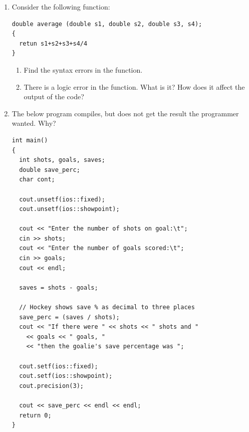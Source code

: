 \begin{enumerate}
	\item Consider the following function:
	
\noindent\begin{minipage}{\linewidth}\begin{lstlisting}
double average (double s1, double s2, double s3, s4);
{
  retun s1+s2+s3+s4/4
}
\end{lstlisting}\end{minipage}

		\begin{enumerate}
		\item Find the syntax errors in the function.
		\item There is a logic error in the function. What is it? How does it affect the output of the code?
		\end{enumerate}

  \item The below program compiles, but does not get the result the programmer wanted. Why? \nopagebreak[4]

\noindent\begin{minipage}{\linewidth}\begin{lstlisting}
int main()
{
  int shots, goals, saves;
  double save_perc;
  char cont;

  cout.unsetf(ios::fixed);
  cout.unsetf(ios::showpoint);

  cout << "Enter the number of shots on goal:\t";
  cin >> shots;
  cout << "Enter the number of goals scored:\t";
  cin >> goals;
  cout << endl;

  saves = shots - goals;

  // Hockey shows save % as decimal to three places
  save_perc = (saves / shots); 
  cout << "If there were " << shots << " shots and " 
    << goals << " goals, " 
    << "then the goalie's save percentage was ";

  cout.setf(ios::fixed);
  cout.setf(ios::showpoint);
  cout.precision(3);
  
  cout << save_perc << endl << endl;
  return 0;
}
\end{lstlisting}\end{minipage}


\end{enumerate}




